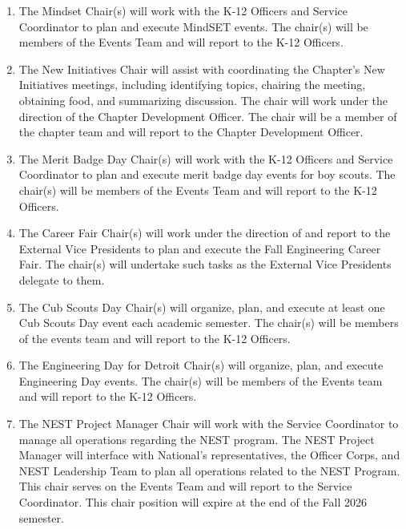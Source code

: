 \begin{enumerate}
    \item {}
    The Mindset Chair(s) will work with the K-12 Officers and Service
Coordinator to plan and execute MindSET events. The chair(s) will be members of
the Events Team and will report to the K-12 Officers.

    \item {}
    The New Initiatives Chair will assist with coordinating the
Chapter’s New Initiatives meetings, including identifying topics, chairing the meeting,
obtaining food, and summarizing discussion. The chair will work under the
direction of the Chapter Development Officer. The chair will be a member of the
chapter team and will report to the Chapter Development Officer.

    \item {}
    The Merit Badge Day Chair(s) will work with the K-12
Officers and Service Coordinator to plan and execute merit badge day events for boy
scouts. The chair(s) will be members of the Events Team and will report to the K-12
Officers.

    \item {}
    The Career Fair Chair(s) will work under the direction of and
report to the External Vice Presidents to plan and execute the Fall Engineering Career
Fair. The chair(s) will undertake such tasks as the External Vice Presidents delegate
to them.

    \item {}
    The Cub Scouts Day Chair(s) will organize, plan, and execute
at least one Cub Scouts Day event each academic semester. The chair(s) will be
members of the events team and will report to the K-12 Officers.

    \item {}
    The Engineering Day for Detroit Chair(s)
will organize, plan, and execute Engineering Day events. The chair(s) will be members
of the Events team and will report to the K-12 Officers.

    \item {}
    The NEST Project Manager Chair will work with the Service Coordinator to manage all operations regarding the NEST program.
The NEST Project Manager will interface with National's representatives, the Officer Corps, and NEST Leadership Team to plan all operations related to the NEST Program.
This chair serves on the Events Team and will report to the Service Coordinator.
This chair position will expire at the end of the Fall 2026 semester.


\end{enumerate}
